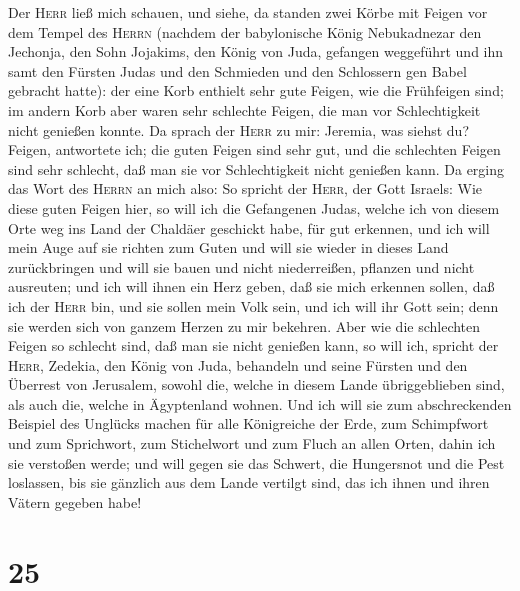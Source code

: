  Der \textsc{Herr} ließ mich schauen, und siehe, da
standen zwei Körbe mit Feigen vor dem Tempel des \textsc{Herrn} (nachdem
der babylonische König Nebukadnezar den Jechonja, den Sohn Jojakims, den
König von Juda, gefangen weggeführt und ihn samt den Fürsten Judas und
den Schmieden und den Schlossern gen Babel gebracht hatte):
 der eine Korb enthielt sehr gute Feigen, wie die
Frühfeigen sind; im andern Korb aber waren sehr schlechte Feigen, die
man vor Schlechtigkeit nicht genießen konnte.  Da sprach
der \textsc{Herr} zu mir: Jeremia, was siehst du? Feigen, antwortete
ich; die guten Feigen sind sehr gut, und die schlechten Feigen sind sehr
schlecht, daß man sie vor Schlechtigkeit nicht genießen kann.
 Da erging das Wort des \textsc{Herrn} an mich also:
 So spricht der \textsc{Herr}, der Gott Israels: Wie diese
guten Feigen hier, so will ich die Gefangenen Judas, welche ich von
diesem Orte weg ins Land der Chaldäer geschickt habe, für gut erkennen,
 und ich will mein Auge auf sie richten zum Guten und will
sie wieder in dieses Land zurückbringen und will sie bauen und nicht
niederreißen, pflanzen und nicht ausreuten;  und ich will
ihnen ein Herz geben, daß sie mich erkennen sollen, daß ich der
\textsc{Herr} bin, und sie sollen mein Volk sein, und ich will ihr Gott
sein; denn sie werden sich von ganzem Herzen zu mir bekehren.
 Aber wie die schlechten Feigen so schlecht sind, daß man
sie nicht genießen kann, so will ich, spricht der \textsc{Herr},
Zedekia, den König von Juda, behandeln und seine Fürsten und den
Überrest von Jerusalem, sowohl die, welche in diesem Lande
übriggeblieben sind, als auch die, welche in Ägyptenland wohnen.
 Und ich will sie zum abschreckenden Beispiel des Unglücks
machen für alle Königreiche der Erde, zum Schimpfwort und zum
Sprichwort, zum Stichelwort und zum Fluch an allen Orten, dahin ich sie
verstoßen werde;  und will gegen sie das Schwert, die
Hungersnot und die Pest loslassen, bis sie gänzlich aus dem Lande
vertilgt sind, das ich ihnen und ihren Vätern gegeben habe!

\hypertarget{section-24}{%
\section{25}\label{section-24}}

